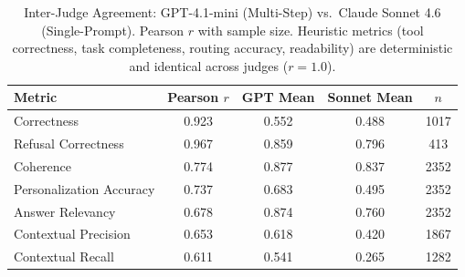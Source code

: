 \begin{table}[htbp]
\centering
\caption{Inter-Judge Agreement: GPT-4.1-mini (Multi-Step) vs.\ Claude Sonnet 4.6 (Single-Prompt). Pearson $r$ with sample size. Heuristic metrics (tool correctness, task completeness, routing accuracy, readability) are deterministic and identical across judges ($r = 1.0$).}
\label{tab:judges}
\begin{tabular}{lcccc}
\toprule
Metric & Pearson $r$ & GPT Mean & Sonnet Mean & $n$ \\
\midrule
Correctness & 0.923 & 0.552 & 0.488 & 1017 \\
Refusal Correctness & 0.967 & 0.859 & 0.796 & 413 \\
Coherence & 0.774 & 0.877 & 0.837 & 2352 \\
Personalization Accuracy & 0.737 & 0.683 & 0.495 & 2352 \\
Answer Relevancy & 0.678 & 0.874 & 0.760 & 2352 \\
Contextual Precision & 0.653 & 0.618 & 0.420 & 1867 \\
Contextual Recall & 0.611 & 0.541 & 0.265 & 1282 \\
\bottomrule
\end{tabular}
\end{table}
